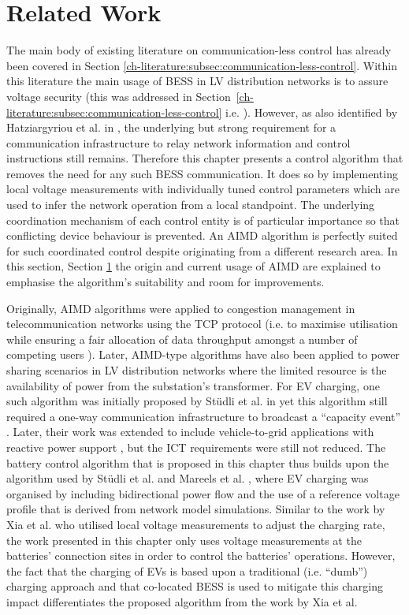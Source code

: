 \section{Related Work}
\label{ch4:sec:related-work}

The main body of existing literature on communication-less control has already been covered in Section \ref{ch-literature:subsec:communication-less-control}.
Within this literature the main usage of BESS in LV distribution networks is to assure voltage security (this was addressed in Section~\ref{ch-literature:subsec:communication-less-control} i.e. \cite{Sugihara2013, Toledo2013, Marra2013, Mokhtari2013, Atia2016}).
However, as also identified by Hatziargyriou et al. in \cite{Hatziargyriou2015}, the underlying but strong requirement for a communication infrastructure to relay network information and control instructions still remains.
Therefore this chapter presents a control algorithm that removes the need for any such BESS communication.
It does so by implementing local voltage measurements with individually tuned control parameters which are used to infer the network operation from a local standpoint.
The underlying coordination mechanism of each control entity is of particular importance so that conflicting device behaviour is prevented.
An AIMD algorithm is perfectly suited for such coordinated control despite originating from a different research area.
In this section, Section \ref{ch4:sec:related-work} the origin and current usage of AIMD are explained to emphasise the algorithm's suitability and room for improvements.

Originally, AIMD algorithms were applied to congestion management in telecommunication networks using the TCP protocol \cite{Chiu1989} (i.e. to maximise utilisation while ensuring a fair allocation of data throughput amongst a number of competing users \cite{Wirth2014}).
Later, AIMD-type algorithms have also been applied to power sharing scenarios in LV distribution networks where the limited resource is the availability of power from the substation's transformer.
For EV charging, one such algorithm was initially proposed by St{\"{u}}dli et al. in \cite{Studli2012} yet this algorithm still required a one-way communication infrastructure to broadcast a ``capacity event'' \cite{Studli2014, Studli2014a}.
Later, their work was extended to include vehicle-to-grid applications with reactive power support \cite {Studli2015}, but the ICT requirements were still not reduced.
The battery control algorithm that is proposed in this chapter thus builds upon the algorithm used by St{\"{u}}dli et al. and Mareels et al. \cite{Mareels2014}, where EV charging was organised by including bidirectional power flow and the use of a reference voltage profile that is derived from network model simulations.
Similar to the work by Xia et al. \cite{Xia2014} who utilised local voltage measurements to adjust the charging rate, the work presented in this chapter only uses voltage measurements at the batteries' connection sites in order to control the batteries' operations.
However, the fact that the charging of EVs is based upon a traditional (i.e. ``dumb'') charging approach and that co-located BESS is used to mitigate this charging impact differentiates the proposed algorithm from the work by Xia et al.

